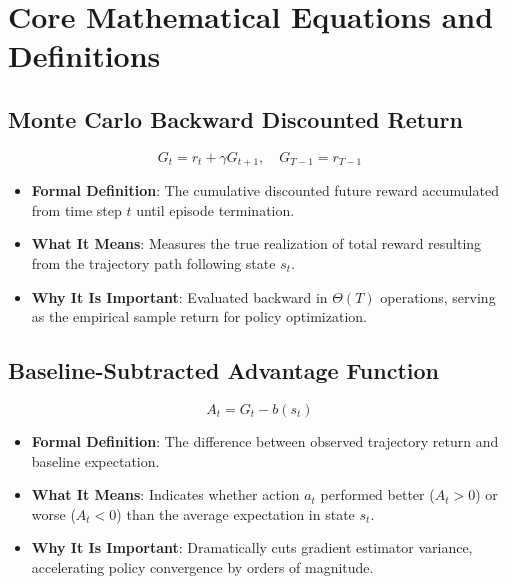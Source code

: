 \documentclass[11pt,a4paper]{article}
\theoremstyle{definition}
\begin{document}
\section{Core Mathematical Equations and Definitions}

\subsection{Monte Carlo Backward Discounted Return}
{\boldmath
\begin{equation}
G_t = r_t + \gamma G_{t+1}, \quad G_{T-1} = r_{T-1}
\end{equation}
}
\begin{itemize}
    \item \textbf{Formal Definition}: The cumulative discounted future reward accumulated from time step $t$ until episode termination.
    \item \textbf{What It Means}: Measures the true realization of total reward resulting from the trajectory path following state $s_t$.
    \item \textbf{Why It Is Important}: Evaluated backward in $\Theta(T)$ operations, serving as the empirical sample return for policy optimization.
\end{itemize}

\subsection{Baseline-Subtracted Advantage Function}
{\boldmath
\begin{equation}
A_t = G_t - b(s_t)
\end{equation}
}
\begin{itemize}
    \item \textbf{Formal Definition}: The difference between observed trajectory return and baseline expectation.
    \item \textbf{What It Means}: Indicates whether action $a_t$ performed better ($A_t > 0$) or worse ($A_t < 0$) than the average expectation in state $s_t$.
    \item \textbf{Why It Is Important}: Dramatically cuts gradient estimator variance, accelerating policy convergence by orders of magnitude.
\end{itemize}
\end{document}
